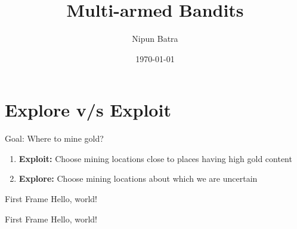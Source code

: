 \documentclass[xcolor=dvipsnames, t]{beamer}
\title{Multi-armed Bandits}
\date{\today}
\author{Nipun Batra}
\institute{Machine Learning CS 612}
\begin{document}
  \maketitle
  \section{Explore v/s Exploit}
  \begin{frame}{Goal: Where to mine gold?}

    \begin{enumerate}
    	\item \textbf{Exploit:} Choose mining locations close to places having high gold content
    	\item \textbf{Explore:} Choose mining locations about which we are uncertain
    \end{enumerate}
  \end{frame}
  \begin{frame}{First Frame}
Hello, world!
\end{frame}
  \begin{frame}{First Frame}
Hello, world!
\end{frame}





\begin{frame}



%
\end{frame}
\end{document}
